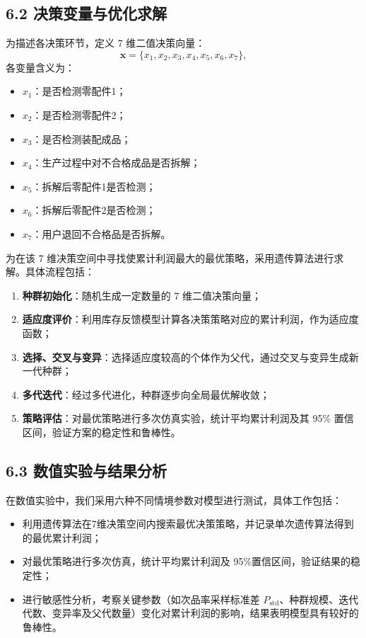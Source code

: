 \documentclass{article}
\begin{document}
	\subsection*{6.2 决策变量与优化求解}
	为描述各决策环节，定义 7 维二值决策向量：
	\[
	\mathbf{x} = \{x_1, x_2, x_3, x_4, x_5, x_6, x_7\},
	\]
	各变量含义为：
	\begin{itemize}
		\item $x_1$：是否检测零配件1；
		\item $x_2$：是否检测零配件2；
		\item $x_3$：是否检测装配成品；
		\item $x_4$：生产过程中对不合格成品是否拆解；
		\item $x_5$：拆解后零配件1是否检测；
		\item $x_6$：拆解后零配件2是否检测；
		\item $x_7$：用户退回不合格品是否拆解。
	\end{itemize}
	
	为在该 7 维决策空间中寻找使累计利润最大的最优策略，采用遗传算法进行求解。具体流程包括：
	\begin{enumerate}
		\item \textbf{种群初始化}：随机生成一定数量的 7 维二值决策向量；
		\item \textbf{适应度评价}：利用库存反馈模型计算各决策策略对应的累计利润，作为适应度函数；
		\item \textbf{选择、交叉与变异}：选择适应度较高的个体作为父代，通过交叉与变异生成新一代种群；
		\item \textbf{多代迭代}：经过多代进化，种群逐步向全局最优解收敛；
		\item \textbf{策略评估}：对最优策略进行多次仿真实验，统计平均累计利润及其 95\% 置信区间，验证方案的稳定性和鲁棒性。
	\end{enumerate}
	\subsection*{6.3 数值实验与结果分析}
	
	在数值实验中，我们采用六种不同情境参数对模型进行测试，具体工作包括：
	\begin{itemize}
		\item 利用遗传算法在7维决策空间内搜索最优决策策略，并记录单次遗传算法得到的最优累计利润；
		\item 对最优策略进行多次仿真，统计平均累计利润及 95\%置信区间，验证结果的稳定性；
		\item 进行敏感性分析，考察关键参数（如次品率采样标准差 $P_{\text{std}}$、种群规模、迭代代数、变异率及父代数量）变化对累计利润的影响，结果表明模型具有较好的鲁棒性。
	\end{itemize}
\end{document}
